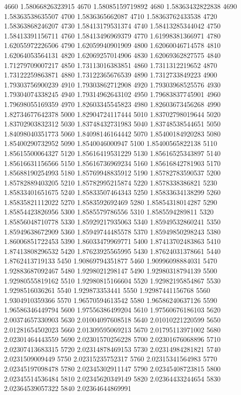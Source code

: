 {4660 1.58066826323915
4670 1.58085159719892
4680 1.58363432822838
4690 1.58363538635507
4700 1.5836365662087
4710 1.58363762433538
4720 1.58363868246207
4730 1.58413179531374
4740 1.58413285344042
4750 1.58413391156711
4760 1.58413496969379
4770 1.61998381366971
4780 1.62055972226506
4790 1.62059940901909
4800 1.62060046714578
4810 1.62064053564131
4820 1.62069257014906
4830 1.62069362827575
4840 1.71279709007217
4850 1.73113016383851
4860 1.7311312219652
4870 1.73122259863871
4880 1.73122365676539
4890 1.7312733849223
4900 1.79303756900239
4910 1.79303862712908
4920 1.79303968525576
4930 1.79304074338245
4940 1.79314962643102
4950 1.79683837745901
4960 1.79698055169359
4970 1.82603345545823
4980 1.82603673456268
4990 1.82734677642378
5000 1.82904724117444
5010 1.83702798019644
5020 1.83702903832312
5030 1.83748432731983
5040 1.83748538544651
5050 1.84098040351773
5060 1.84098146164442
5070 1.85400184920283
5080 1.85400290732952
5090 1.8540046000947
5100 1.85400565822138
5110 1.85615500064327
5120 1.85616419531229
5130 1.85616525343897
5140 1.85616631156566
5150 1.85616736969234
5160 1.85616842781903
5170 1.85688190254993
5180 1.85769948835912
5190 1.85782783590537
5200 1.85782889403205
5210 1.85782995215874
5220 1.8578338386821
5230 1.85833401651675
5240 1.85833507464343
5250 1.85833634138299
5260 1.85835821112022
5270 1.8583592692469
5280 1.85854318014287
5290 1.85854423826956
5300 1.8585579786556
5310 1.8585594289811
5320 1.85856048710778
5330 1.85929217935063
5340 1.85949532860241
5350 1.85949638672909
5360 1.85949744485578
5370 1.85949850298243
5380 1.86006851722453
5390 1.86033479969771
5400 1.87413702483863
5410 1.87413808296532
5420 1.87623925565995
5430 1.87624031378661
5440 1.8762413719133
5450 1.90869794351877
5460 1.90996098884031
5470 1.92883687092467
5480 1.9298021298147
5490 1.92980318794139
5500 1.92980555819162
5510 1.92980815166604
5520 1.92982195854867
5530 1.9298516036261
5540 1.929873353441
5550 1.92987441156768
5560 1.9304910359366
5570 1.96570594613542
5580 1.96586240637126
5590 1.96586346449794
5600 1.97556386499204
5610 1.97560676186103
5620 2.00374657330903
5630 2.01004097608518
5640 2.01010221220599
5650 2.01281654502023
5660 2.01309595069213
5670 2.01795113971002
5680 2.02301464443559
5690 2.02301570256228
5700 2.02301676068896
5710 2.02307413683315
5720 2.02314878469153
5730 2.02314984281821
5740 2.0231509009449
5750 2.02315235752317
5760 2.02315341564983
5770 2.02345197098478
5780 2.02345302911147
5790 2.02345408723815
5800 2.02345514536484
5810 2.02345620349149
5820 2.02364433244654
5830 2.02364539057322
5840 2.02364644869991
}
